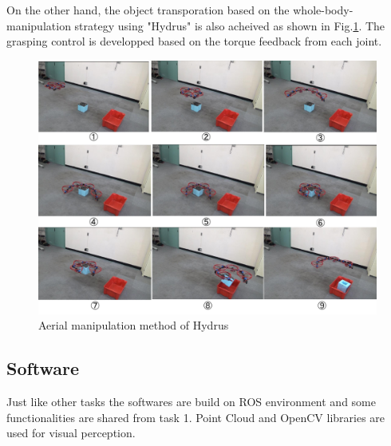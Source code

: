\documentclass{standalone}
\begin{document}
On the other hand, the object transporation based on the whole-body-manipulation strategy using "Hydrus" is also acheived as shown in Fig.\ref{fig:task3-hydrus-manipulation}. The grasping control is developped  based on the torque feedback from each joint. 

\begin{figure}[h]
  \begin{center}
    \includegraphics[clip,  bb=0 0 720 540,  width=\columnwidth]{sections/task3/images/task3-hydrus-manipulation.pdf}
    \caption{Aerial manipulation method of Hydrus}
    \label{fig:task3-hydrus-manipulation}
  \end{center}
\end{figure} 

\subsection{Software}
Just like other tasks the softwares are build on ROS environment and some functionalities are shared from task 1. Point Cloud and OpenCV libraries are used for visual perception. %
\end{document}

